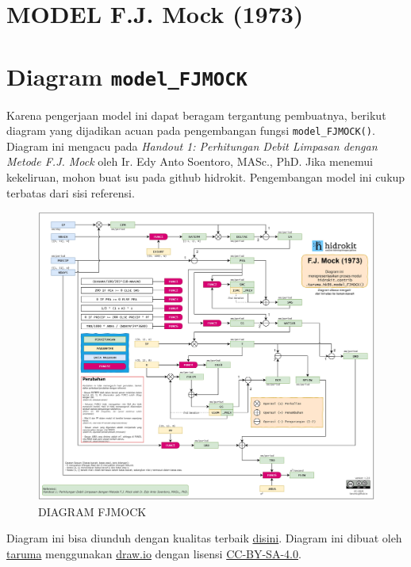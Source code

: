 \documentclass[11pt]{article}
\begin{document}
    \hypertarget{model-f.j.-mock-1973}{%
\section{MODEL F.J. Mock (1973)}\label{model-f.j.-mock-1973}}

    \hypertarget{diagram-model_fjmock}{%
\section{\texorpdfstring{Diagram
\texttt{model\_FJMOCK}}{Diagram model\_FJMOCK}}\label{diagram-model_fjmock}}

Karena pengerjaan model ini dapat beragam tergantung pembuatnya, berikut
diagram yang dijadikan acuan pada pengembangan fungsi
\texttt{model\_FJMOCK()}. Diagram ini mengacu pada \emph{Handout 1:
Perhitungan Debit Limpasan dengan Metode F.J. Mock} oleh Ir. Edy Anto
Soentoro, MASc., PhD. Jika menemui kekeliruan, mohon buat isu pada
github hidrokit. Pengembangan model ini cukup terbatas dari sisi
referensi.

\begin{figure}
\centering
\includegraphics{FJMOCK_hidrokit_1_2_0_300.jpg}
\caption{DIAGRAM FJMOCK}
\end{figure}

Diagram ini bisa diunduh dengan kualitas terbaik
\href{https://github.com/taruma/taruma.github.io/blob/master/assets/hidrokit_assets/FJMOCK_hidrokit_1_2_0_1000.jpg?raw=true}{disini}.
Diagram ini dibuat oleh \href{https://taruma.github.io}{taruma}
menggunakan \href{https://www.draw.io}{draw.io} dengan lisensi
\href{https://creativecommons.org/licenses/by-sa/4.0/}{CC-BY-SA-4.0}.
\end{document}
